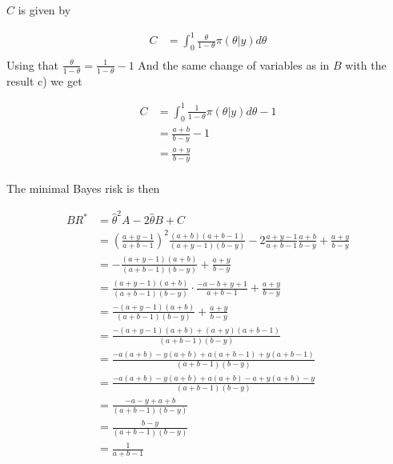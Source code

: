 \documentclass{article}
\begin{document}
\begin{enumerate}
$C$ is given by

\begin{align*}
    C &= \int_0^1 \frac{\theta}{1-\theta} \pi(\theta | y) d\theta\\
\end{align*}
Using that
$\frac{\theta}{1-\theta} = \frac{1}{1-\theta} - 1$
And the same change of variables as in $B$ with the result c) we get

\begin{align*}
    C &= \int_0^1 \frac{1}{1-\theta} \pi(\theta | y) d\theta - 1\\
    &= \frac{a+b}{b-y} - 1\\
    &= \frac{a+y}{b-y}\\
\end{align*}


The minimal Bayes risk is then

\begin{align*}
    BR^* &= \hat{\theta}^2 A -2 \hat{\theta} B + C\\
    &= \left(\frac{a + y - 1}{a + b - 1}\right)^2 \frac{(a+b)(a+b-1)}{(a+y-1)(b-y)} -2 \frac{a + y - 1}{a + b - 1} \frac{a+b}{b-y} + \frac{a+y}{b-y}\\
    &= -\frac{(a + y - 1)(a+b)}{(a + b - 1)(b-y)} + \frac{a+y}{b-y}\\
    &= \frac{(a + y - 1)(a + b)}{(a + b - 1)(b - y)} \cdot \frac{-a - b + y + 1}{a + b - 1} + \frac{a + y}{b - y} \\
    &= \frac{-(a + y - 1)(a + b)}{(a + b - 1)(b - y)} + \frac{a + y}{b - y} \\
    &= \frac{-(a + y - 1)(a + b) + (a + y)(a + b - 1)}{(a + b - 1)(b - y)} \\
    &= \frac{-a(a + b) - y(a + b) + a(a + b - 1) + y(a + b - 1)}{(a + b - 1)(b - y)} \\
    &= \frac{-a(a + b) - y(a + b) + a(a + b) - a + y(a + b) - y}{(a + b - 1)(b - y)} \\
    &= \frac{-a - y + a + b}{(a + b - 1)(b - y)} \\
    &= \frac{b - y}{(a + b - 1)(b - y)} \\
    &= \frac{1}{a + b - 1}
\end{align*}



\end{enumerate}

\section{}
\end{document}
